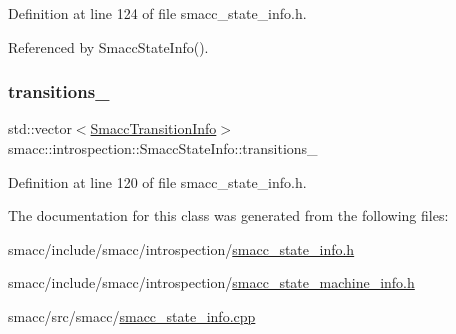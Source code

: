 Definition at line 124 of file smacc\+\_\+state\+\_\+info.\+h.



Referenced by Smacc\+State\+Info().

\mbox{\label{classsmacc_1_1introspection_1_1SmaccStateInfo_ae8b5d8e409e377ef9a88d92fb31a8446}} 
\subsubsection{\texorpdfstring{transitions\+\_\+}{transitions\_}}
{\footnotesize\ttfamily std\+::vector$<$\hyperlink{structsmacc_1_1introspection_1_1SmaccTransitionInfo}{Smacc\+Transition\+Info}$>$ smacc\+::introspection\+::\+Smacc\+State\+Info\+::transitions\+\_\+}



Definition at line 120 of file smacc\+\_\+state\+\_\+info.\+h.



The documentation for this class was generated from the following files\+:\begin{DoxyCompactItemize}
\item 
smacc/include/smacc/introspection/\hyperlink{smacc__state__info_8h}{smacc\+\_\+state\+\_\+info.\+h}\item 
smacc/include/smacc/introspection/\hyperlink{smacc__state__machine__info_8h}{smacc\+\_\+state\+\_\+machine\+\_\+info.\+h}\item 
smacc/src/smacc/\hyperlink{smacc__state__info_8cpp}{smacc\+\_\+state\+\_\+info.\+cpp}\end{DoxyCompactItemize}
